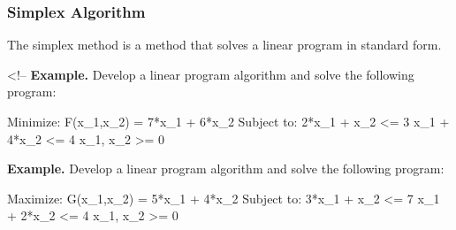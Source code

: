\documentclass[11pt]{article}
\newenvironment{Shaded}{}{}
\newcommand{\NormalTok}[1]{{#1}}
\begin{document}
\subsubsection{Simplex Algorithm}\label{simplex-algorithm}

The simplex method is a method that solves a linear program in standard
form.

\textless!-- \textbf{Example.} Develop a linear program algorithm and
solve the following program:

\begin{Shaded}
\begin{Highlighting}[]
\NormalTok{  Minimize:}
\NormalTok{          F(x\_1,x\_2) = 7*x\_1 + 6*x\_2}
\NormalTok{  Subject to:}
\NormalTok{         2*x\_1 + x\_2 \textless{}= 3}
\NormalTok{         x\_1 + 4*x\_2 \textless{}= 4}
\NormalTok{            x\_1, x\_2 \textgreater{}= 0}
\end{Highlighting}
\end{Shaded}

\textbf{Example.} Develop a linear program algorithm and solve the
following program:

\begin{Shaded}
\begin{Highlighting}[]
\NormalTok{  Maximize:}
\NormalTok{          G(x\_1,x\_2) = 5*x\_1 + 4*x\_2}
\NormalTok{  Subject to:}
\NormalTok{         3*x\_1 + x\_2 \textless{}= 7}
\NormalTok{         x\_1 + 2*x\_2 \textless{}= 4}
\NormalTok{            x\_1, x\_2 \textgreater{}= 0}
\end{Highlighting}
\end{Shaded}
\end{document}
